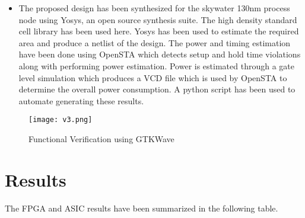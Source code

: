 \documentclass[conference]{IEEEtran}
\begin{document}
\begin{itemize}
    \item The proposed design has been synthesized for the skywater 130nm process node using Yosys, an open source synthesis suite. The high density standard cell library has been used here.  Yosys has been used to estimate the required area and produce a netlist of the design. The power and timing estimation have been done using OpenSTA which detects setup and hold time violations along with performing power estimation. Power is estimated through a gate level simulation which produces a VCD file which is used by OpenSTA to determine the overall power consumption. A python script has been used to automate generating these results.
\end{itemize}


\begin{figure}[h!]
    \centering
    \texttt{[image: v3.png]}  %
    \caption{Functional Verification using GTKWave}  %
    \label{fig:verif}  %
\end{figure}

\section*{Results}
The FPGA and ASIC results have been summarized in the following table.

\begin{table}[H]
\centering
{}
\caption{Results Table}
\end{table}
\end{document}

